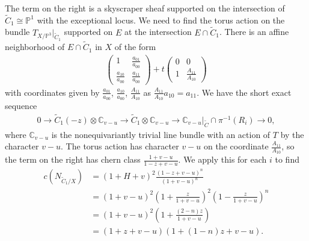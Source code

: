 \documentclass[12 pt, reqno]{amsart}
\theoremstyle{definition}
\newcommand{\mb}{\mathbb}
\newcommand{\wt}{\widetilde}
\begin{document}
The term on the right is a skyscraper sheaf supported on the
intersection of $\wt{C}_1\cong \mb{P}^1$ with the exceptional
locus. We need to find the torus action on the bundle
$T_{X/\mb{P}^3}|_{\wt{C}_1}$ supported on $E$ at the intersection
$E\cap \wt{C}_1$. There is an affine neighborhood of $E\cap \wt{C}_1$
in $X$ of the form
\begin{align*}
\begin{pmatrix}
1 & \frac{a_{01}}{a_{00}}\\
\frac{a_{10}}{a_{00}} & \frac{a_{11}}{a_{00}}
\end{pmatrix}
+ t
\begin{pmatrix}
0 & 0 \\
1 & \frac{A_{11}}{A_{10}}
\end{pmatrix}
\end{align*}
with coordinates given by $\frac{a_{01}}{a_{00}}$,
$\frac{a_{10}}{a_{00}} $, $\frac{A_{11}}{A_{10}}$ as
$\frac{A_{11}}{A_{10}}a_{10}=a_{11}$. We have the short exact sequence
\begin{align*}
0\to \wt{C}_1(-z)\otimes \mb{C}_{v-u}\to \wt{C}_1\otimes \mb{C}_{v-u}\to \mb{C}_{v-u}|_{\wt{C}}\cap \pi^{-1}(R_i)\to 0,
\end{align*}
where $\mb{C}_{v-u}$ is the nonequivariantly trivial line bundle with
an action of $T$ by the character $v-u$. The torus action has
character $v-u$ on the coordinate $\frac{A_{11}}{A_{10}}$, so the term
on the right has chern class $\frac{1+v-u}{1-z+v-u}$. We apply this
for each $i$ to find
\begin{align*}
c(N_{\wt{C}_1/X}) &= (1+H+v)^2\frac{(1-z+v-u)^n}{(1+v-u)^n}\\
&=(1+v-u)^2(1+\frac{z}{1+v-u})^2(1-\frac{z}{1+v-u})^n\\
&=(1+v-u)^2(1+\frac{(2-n)z}{1+v-u})\\
&=(1+z+v-u)(1+(1-n)z+v-u).
\end{align*}
\end{document}
